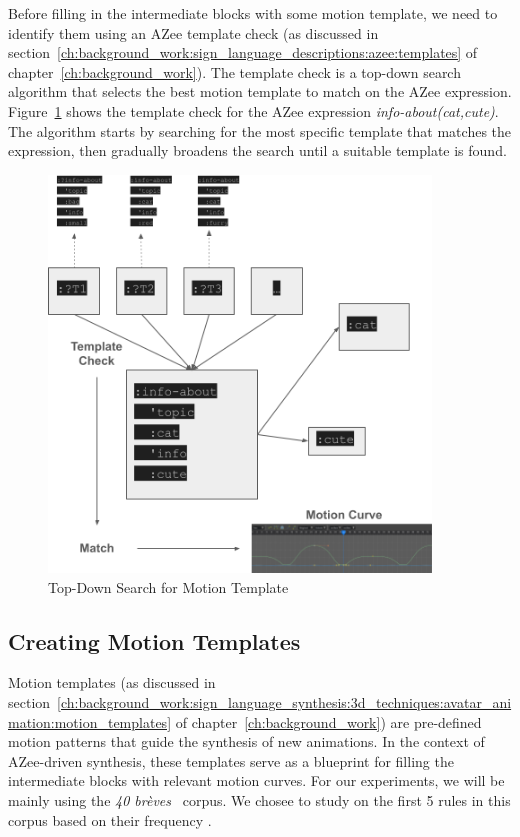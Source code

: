 \documentclass[../../main.tex]{subfiles}
\begin{document}
Before filling in the intermediate blocks with some motion template, we need to identify them using an AZee template check (as discussed in section~\ref{ch:background_work:sign_language_descriptions:azee:templates} of chapter~\ref{ch:background_work}). The template check is a top-down search algorithm that selects the best motion template to match on the AZee expression. Figure~\ref{fig:top_down_search_template} shows the template check for the AZee expression \emph{info-about(cat,cute)}. The algorithm starts by searching for the most specific template that matches the expression, then gradually broadens the search until a suitable template is found.


\begin{figure}
    \centering \includegraphics[width = 4in]{chapters/intermediate_blocks_pose_correction/images/top_down_search_template.png}
    \caption{Top-Down Search for Motion Template}
    \label{fig:top_down_search_template}
\end{figure}

\subsection{Creating Motion Templates}
\label{ch:intermediate_blocks_pose_correction:creating_motion_templates}

Motion templates (as discussed in section~\ref{ch:background_work:sign_language_synthesis:3d_techniques:avatar_animation:motion_templates} of chapter~\ref{ch:background_work}) are pre-defined motion patterns that guide the synthesis of new animations. In the context of AZee-driven synthesis, these templates serve as a blueprint for filling the intermediate blocks with relevant motion curves. For our experiments, we will be mainly using the \emph{40 brèves}~\cite{challant2022first} corpus. We chosee to study on the first 5 rules in this corpus based on their frequency .
\end{document}

